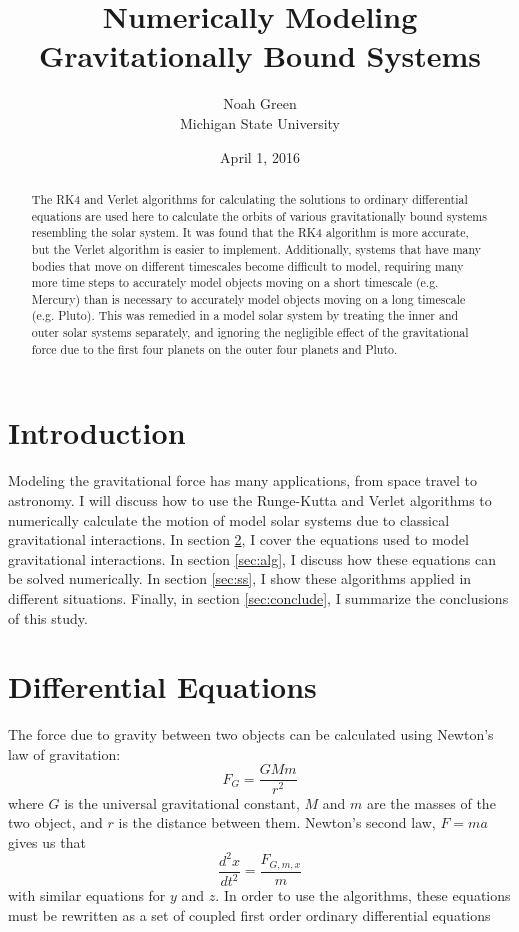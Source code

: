 \documentclass[a4paper,12pt]{report}
\begin{document}
\title{Numerically Modeling Gravitationally Bound Systems}
\author{Noah Green \\ Michigan State University}
\date{April 1, 2016}
\maketitle
\begin{abstract}
The RK4 and Verlet algorithms for calculating the solutions to ordinary differential equations are used here to calculate the orbits of various gravitationally bound systems resembling the solar system. It was found that the RK4 algorithm is more accurate, but the Verlet algorithm is easier to implement. Additionally, systems that have many bodies that move on different timescales become difficult to model, requiring many more time steps to accurately model objects moving on a short timescale (e.g. Mercury) than is necessary to accurately model objects moving on a long timescale (e.g. Pluto). This was remedied in a model solar system by treating the inner and outer solar systems separately, and ignoring the negligible effect of the gravitational force due to the first four planets on the outer four planets and Pluto.
\end{abstract}

\doublespacing
\section{Introduction}\label{sec:intro}
Modeling the gravitational force has many applications, from space travel to astronomy. I will discuss how to use the Runge-Kutta and Verlet algorithms to numerically calculate the motion of model solar systems due to classical gravitational interactions. In section \ref{sec:diffeq}, I cover the equations used to model gravitational interactions. In section \ref{sec:alg}, I discuss how these equations can be solved numerically. In section \ref{sec:ss}, I show these algorithms applied in different situations. Finally, in section \ref{sec:conclude}, I summarize the conclusions of this study.

\section{Differential Equations}\label{sec:diffeq}
The force due to gravity between two objects can be calculated using Newton's law of gravitation:
\begin{equation}\label{eq:gravitation}
 F_G = \frac{GMm}{r^2}
\end{equation}
where $G$ is the universal gravitational constant, $M$ and $m$ are the masses of the two object, and $r$ is the distance between them. Newton's second law, $F = ma$ gives us that 
\begin{equation}\label{eq:nsl}
 \frac{d^2x}{dt^2} = \frac{F_{G,m,x}}{m}
\end{equation}
with similar equations for $y$ and $z$. In order to use the algorithms, these equations must be rewritten as a set of coupled first order ordinary differential equations
\end{document}
